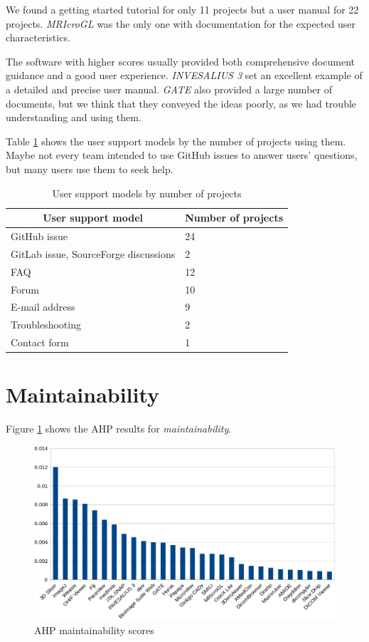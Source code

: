 We found a getting started tutorial for only 11 projects but a user manual for 22 projects. \textit{MRIcroGL} was the only one with documentation for the expected user characteristics.

The software with higher scores usually provided both comprehensive document guidance and a good user experience. \textit{INVESALIUS 3} set an excellent example of a detailed and precise user manual. \textit{GATE} also provided a large number of documents, but we think that they conveyed the ideas poorly, as we had trouble understanding and using them.
 
Table \ref{tab_user_support_model} shows the user support models by the number of projects using them. Maybe not every team intended to use GitHub issues to answer users' questions, but many users use them to seek help.

\begin{table}[H]
\centering
\begin{tabular}{ll}
\hline
\multicolumn{1}{c}{User support model} & Number of projects \\ \hline
GitHub issue & 24 \\
GitLab issue, SourceForge discussions & 2 \\
FAQ & 12 \\
Forum & 10 \\
E-mail address & 9 \\
Troubleshooting & 2 \\
Contact form & 1 \\ \hline
\end{tabular}
\caption{\label{tab_user_support_model}User support models by number of projects}
\end{table}

\section{Maintainability}
\label{sec_score_maintainability}
Figure \ref{fg_maintainability_scores} shows the AHP results for \textit{maintainability}. 

\begin{figure}[H]
\includegraphics[scale=0.38]{figures/maintainability_scores.png}
\caption{AHP maintainability scores}
\label{fg_maintainability_scores}
\end{figure}

